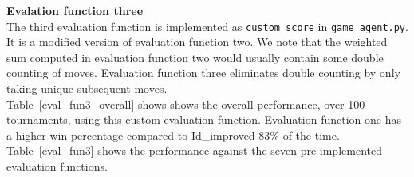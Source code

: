 \documentclass[11pt]{article}
\begin{document}
{\bf Evalation function three}\\
The third evaluation function is implemented as \texttt{custom\_score} in \texttt{game\_agent.py}. It is a modified version of evaluation function two. We note that the weighted sum computed in evaluation function two would usually contain some double counting of moves. Evaluation function three eliminates double counting by only taking unique subsequent moves.\\

Table~\ref{eval_fun3_overall} shows shows the overall performance, over 100 tournaments, using this custom evaluation function. Evaluation function one has a higher win percentage compared to Id\_improved 83\% of the time. Table~\ref{eval_fun3} shows the performance against the seven pre-implemented evaluation functions. 
\end{document}
